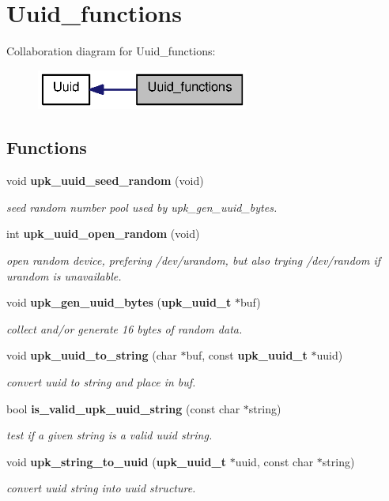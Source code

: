 \section{Uuid\_\-functions}
\label{group__uuid__functions}
Collaboration diagram for Uuid\_\-functions:\nopagebreak
\begin{figure}[H]
\begin{center}
\leavevmode
\includegraphics[width=198pt]{group__uuid__functions}
\end{center}
\end{figure}
\subsection*{Functions}
\begin{DoxyCompactItemize}
\item 
void {\bf upk\_\-uuid\_\-seed\_\-random} (void)
\begin{DoxyCompactList}\small\item\em seed random number pool used by upk\_\-gen\_\-uuid\_\-bytes. \end{DoxyCompactList}\item 
int {\bf upk\_\-uuid\_\-open\_\-random} (void)
\begin{DoxyCompactList}\small\item\em open random device, prefering /dev/urandom, but also trying /dev/random if urandom is unavailable. \end{DoxyCompactList}\item 
void {\bf upk\_\-gen\_\-uuid\_\-bytes} ({\bf upk\_\-uuid\_\-t} $\ast$buf)
\begin{DoxyCompactList}\small\item\em collect and/or generate 16 bytes of random data. \end{DoxyCompactList}\item 
void {\bf upk\_\-uuid\_\-to\_\-string} (char $\ast$buf, const {\bf upk\_\-uuid\_\-t} $\ast$uuid)
\begin{DoxyCompactList}\small\item\em convert uuid to string and place in buf. \end{DoxyCompactList}\item 
bool {\bf is\_\-valid\_\-upk\_\-uuid\_\-string} (const char $\ast$string)
\begin{DoxyCompactList}\small\item\em test if a given string is a valid uuid string. \end{DoxyCompactList}\item 
void {\bf upk\_\-string\_\-to\_\-uuid} ({\bf upk\_\-uuid\_\-t} $\ast$uuid, const char $\ast$string)
\begin{DoxyCompactList}\small\item\em convert uuid string into uuid structure. \end{DoxyCompactList}\end{DoxyCompactItemize}


